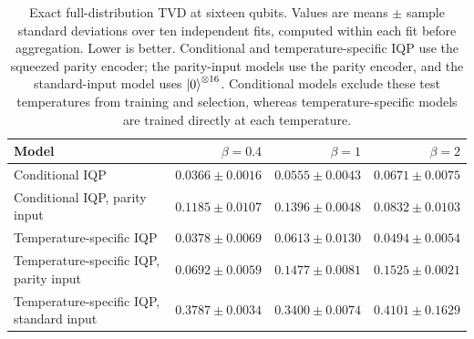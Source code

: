 \begin{table}[t]
\centering
\small
\caption{Exact full-distribution TVD at sixteen qubits. Values are means $\pm$ sample standard deviations over ten independent fits, computed within each fit before aggregation. Lower is better. Conditional and temperature-specific IQP use the squeezed parity encoder; the parity-input models use the parity encoder, and the standard-input model uses $\ket{0}^{\otimes16}$. Conditional models exclude these test temperatures from training and selection, whereas temperature-specific models are trained directly at each temperature.}
\label{tab:curie_weiss_full_tvd}
\begin{tabular}{lrrr}
\toprule
Model & $\beta=0.4$ & $\beta=1$ & $\beta=2$ \\
\midrule
Conditional IQP & $0.0366\pm0.0016$ & $0.0555\pm0.0043$ & $0.0671\pm0.0075$ \\
Conditional IQP, parity input & $0.1185\pm0.0107$ & $0.1396\pm0.0048$ & $0.0832\pm0.0103$ \\
Temperature-specific IQP & $0.0378\pm0.0069$ & $0.0613\pm0.0130$ & $0.0494\pm0.0054$ \\
Temperature-specific IQP, parity input & $0.0692\pm0.0059$ & $0.1477\pm0.0081$ & $0.1525\pm0.0021$ \\
Temperature-specific IQP, standard input & $0.3787\pm0.0034$ & $0.3400\pm0.0074$ & $0.4101\pm0.1629$ \\
\bottomrule
\end{tabular}
\end{table}
